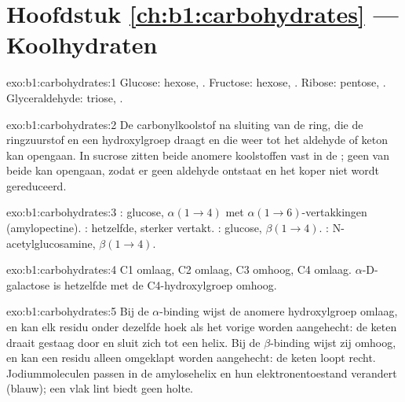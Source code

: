\section*{Hoofdstuk \ref{ch:b1:carbohydrates} --- Koolhydraten}

\begin{solution}{exo:b1:carbohydrates:1}
Glucose: hexose, . Fructose: hexose, . Ribose: pentose, .
Glyceraldehyde: triose, .
\end{solution}

\begin{solution}{exo:b1:carbohydrates:2}
De carbonylkoolstof na sluiting van de ring, die de ringzuurstof en een
hydroxylgroep draagt en die weer tot het aldehyde of keton kan opengaan. In
sucrose zitten beide anomere koolstoffen vast in de ; geen van
beide kan opengaan, zodat er geen aldehyde ontstaat en het koper niet wordt
gereduceerd.
\end{solution}

\begin{solution}{exo:b1:carbohydrates:3}
: glucose, $\alpha(1{\to}4)$ met $\alpha(1{\to}6)$-vertakkingen
(amylopectine). : hetzelfde, sterker vertakt. : glucose,
$\beta(1{\to}4)$. : N-acetylglucosamine, $\beta(1{\to}4)$.
\end{solution}

\begin{solution}{exo:b1:carbohydrates:4}
C1 omlaag, C2 omlaag, C3 omhoog, C4 omlaag. $\alpha$-D-galactose is hetzelfde met
de C4-hydroxylgroep omhoog.
\end{solution}

\begin{solution}{exo:b1:carbohydrates:5}
Bij de $\alpha$-binding wijst de anomere hydroxylgroep omlaag, en kan elk residu
onder dezelfde hoek als het vorige worden aangehecht: de keten draait gestaag door
en sluit zich tot een helix. Bij de $\beta$-binding wijst zij omhoog, en kan een
residu alleen omgeklapt worden aangehecht: de keten loopt recht. Jodiummoleculen
passen in de amylosehelix en hun elektronentoestand verandert (blauw); een vlak
lint biedt geen holte.
\end{solution}

